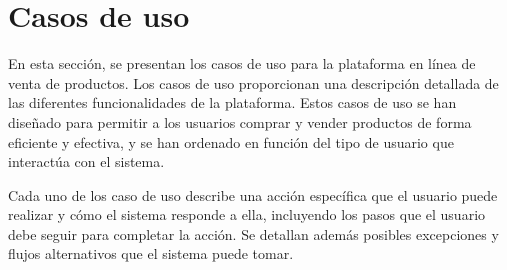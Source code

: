 
\section{Casos de uso}\label{sec:casos-uso}
En esta sección, se presentan los casos de uso para la plataforma en línea de venta de productos. Los casos de uso proporcionan una descripción detallada de las diferentes funcionalidades de la plataforma. Estos casos de uso se han diseñado para permitir a los usuarios comprar y vender productos de forma eficiente y efectiva, y se han ordenado en función del tipo de usuario que interactúa con el sistema.

Cada uno de los caso de uso describe una acción específica que el usuario puede realizar y cómo el sistema responde a ella, incluyendo los pasos que el usuario debe seguir para completar la acción. Se detallan además posibles excepciones y flujos alternativos que el sistema puede tomar.

